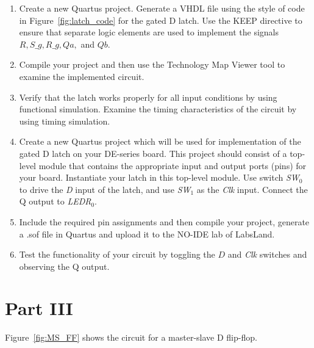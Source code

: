 \documentclass[epsfig,10pt,fullpage]{article}
\begin{document}
\begin{enumerate}
\item Create a new Quartus project. Generate a VHDL file using the style of code 
in Figure~\ref{fig:latch_code} for the gated D latch. Use the KEEP directive to ensure
that separate logic elements are used to implement the signals $R, S\_g, R\_g, Qa,$ and
$Qb$.
\item Compile your project and then use the 
Technology Map Viewer tool to examine the implemented circuit.
\item Verify that the latch works properly for all input conditions by using functional 
simulation. Examine the timing characteristics of the circuit by using timing simulation.
\item Create a new Quartus project which will be used for implementation of the gated D
latch on your DE-series board. This project should consist of a top-level module that 
contains the appropriate input and output ports (pins) for your board. Instantiate your
latch in this top-level module. Use switch {\it SW}$_0$ to drive the {\it D} input of the latch,
and use {\it SW}$_1$ as the {\it Clk} input. Connect the Q output to {\it LEDR}$_{0}$.
\item
Include the required pin assignments and then compile your project, generate a .sof file in Quartus and upload it to the NO-IDE lab of LabsLand.
\item
Test the functionality of your circuit by toggling the $D$ and {\it Clk} switches and observing 
the Q output.
\end{enumerate}

\section*{Part III}
Figure~\ref{fig:MS_FF} shows the circuit for a master-slave D flip-flop.
\end{document}

